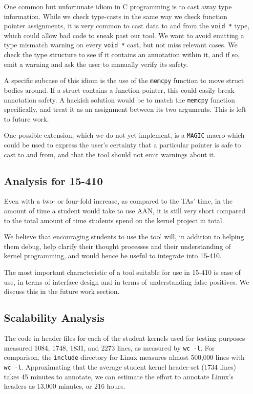 \documentclass{article}
\begin{document}
One common but unfortunate idiom in C programming is to cast away type information. While we check type-casts in the same way we check function pointer assignments, it is very common to cast data to and from the \texttt{void *} type, which could allow bad code to sneak past our tool. We want to avoid emitting a type mismatch warning on every \texttt{void *} cast, but not miss relevant cases. We check the type structure to see if it contains an annotation within it, and if so, emit a warning and ask the user to manually verify its safety.

A specific subcase of this idiom is the use of the \texttt{memcpy} function to move struct bodies around. If a struct contains a function pointer, this could easily break annotation safety. A hackish solution would be to match the \texttt{memcpy} function specifically, and treat it as an assignment between its two arguments. This is left to future work.

One possible extension, which we do not yet implement, is a \texttt{MAGIC} macro which could be used to express the user's certainty that a particular pointer is safe to cast to and from, and that the tool should not emit warnings about it.

\subsection{Analysis for 15-410}

Even with a two- or four-fold increase, as compared to the TAs' time, in the amount of time a student would take to use AAN, it is still very short compared to the total amount of time students spend on the kernel project in total.

We believe that encouraging students to use the tool will, in addition to helping them debug, help clarify their thought processes and their understanding of kernel programming, and would hence be useful to integrate into 15-410.

The most important characteristic of a tool suitable for use in 15-410 is ease of use, in terms of interface design and in terms of understanding false positives. We discuss this in the future work section.

\subsection{Scalability Analysis}

The code in header files for each of the student kernels used for testing purposes measured 1084, 1748, 1831, and 2273 lines, as measured by \texttt{wc -l}.
For comparison, the \texttt{include} directory for Linux measures almost 500,000 lines with \texttt{wc -l}.
Approximating that the average student kernel header-set (1734 lines) takes 45 minutes to annotate, we can estimate the effort to annotate Linux's headers as 13,000 minutes, or 216 hours.
\end{document}
